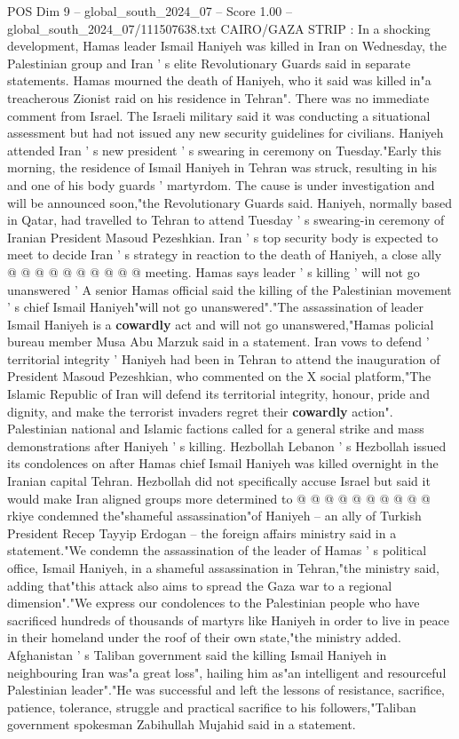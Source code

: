 \begin{textsample}{POS Dim 9 – global\_south\_2024\_07 – Score 1.00 – global\_south\_2024\_07/111507638.txt}  \label{ex:f9_pos_107}
CAIRO/GAZA STRIP : In a shocking development, Hamas leader Ismail Haniyeh was killed in Iran on Wednesday, the Palestinian group and Iran ' s elite Revolutionary Guards said in separate statements.
Hamas mourned the death of Haniyeh, who it said was killed in"a treacherous Zionist raid on his residence in Tehran".
There was no immediate comment from Israel.
The Israeli military said it was conducting a situational assessment but had not issued any new security guidelines for civilians.
Haniyeh attended Iran ' s new president ' s swearing in ceremony on Tuesday."Early this morning, the residence of Ismail Haniyeh in Tehran was struck, resulting in his and one of his body guards ' martyrdom.
The cause is under investigation and will be announced soon,"the Revolutionary Guards said.
Haniyeh, normally based in Qatar, had travelled to Tehran to attend Tuesday ' s swearing-in ceremony of Iranian President Masoud Pezeshkian.
Iran ' s top security body is expected to meet to decide Iran ' s strategy in reaction to the death of Haniyeh, a close ally @ @ @ @ @ @ @ @ @ @ meeting.
Hamas says leader ' s killing ' will not go unanswered ' A senior Hamas official said the killing of the Palestinian movement ' s chief Ismail Haniyeh"will not go unanswered"."The assassination of leader Ismail Haniyeh is a \textbf{cowardly} act and will not go unanswered,"Hamas policial bureau member Musa Abu Marzuk said in a statement.
Iran vows to defend ' territorial integrity ' Haniyeh had been in Tehran to attend the inauguration of President Masoud Pezeshkian, who commented on the X social platform,"The Islamic Republic of Iran will defend its territorial integrity, honour, pride and dignity, and make the terrorist invaders regret their \textbf{cowardly} action".
Palestinian national and Islamic factions called for a general strike and mass demonstrations after Haniyeh ' s killing.
Hezbollah Lebanon ' s Hezbollah issued its condolences on after Hamas chief Ismail Haniyeh was killed overnight in the Iranian capital Tehran.
Hezbollah did not specifically accuse Israel but said it would make Iran aligned groups more determined to @ @ @ @ @ @ @ @ @ @ rkiye condemned the"shameful assassination"of Haniyeh -- an ally of Turkish President Recep Tayyip Erdogan -- the foreign affairs ministry said in a statement."We condemn the assassination of the leader of Hamas ' s political office, Ismail Haniyeh, in a shameful assassination in Tehran,"the ministry said, adding that"this attack also aims to spread the Gaza war to a regional dimension"."We express our condolences to the Palestinian people who have sacrificed hundreds of thousands of martyrs like Haniyeh in order to live in peace in their homeland under the roof of their own state,"the ministry added.
Afghanistan ' s Taliban government said the killing Ismail Haniyeh in neighbouring Iran was"a great loss", hailing him as"an intelligent and resourceful Palestinian leader"."He was successful and left the lessons of resistance, sacrifice, patience, tolerance, struggle and practical sacrifice to his followers,"Taliban government spokesman Zabihullah Mujahid said in a statement.

\end{textsample}
